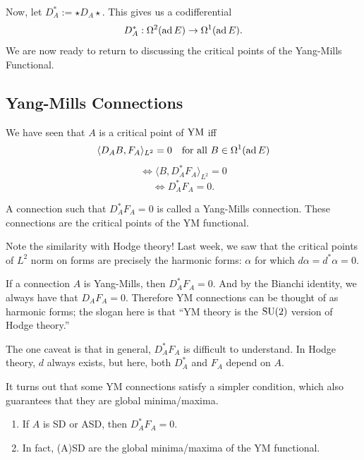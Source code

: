\documentclass[main]{subfiles}
\begin{document}
Now, let $D_A^\ast := \star D_A \star$. This gives us a codifferential
\[
D_A^\ast : \Omega^2(\operatorname{ad} E) \to \Omega^1(\operatorname{ad} E).
\]
We are now ready to return to discussing the critical points of the Yang-Mills Functional.

\subsection*{Yang-Mills Connections}

We have seen that $A$ is a critical point of $\operatorname{YM}$ iff
\[
\langle D_AB, F_A\rangle_{L^2} = 0 \quad \text{for all } B\in\Omega^1(\operatorname{ad} E)
\]
\[
\Leftrightarrow \langle B, D_A^\ast F_A\rangle_{L^2} = 0
\]
\[
\Leftrightarrow D_A^\ast F_A = 0.
\]

\begin{definition}
A connection such that $D_A^\ast F_A = 0$ is called a Yang-Mills connection. These connections are the critical points of the YM functional.
\end{definition}

Note the similarity with Hodge theory! Last week, we saw that the critical points of $L^2$ norm on forms are precisely the harmonic forms: $\alpha$ for which $d\alpha = d^\ast\alpha = 0$.

If a connection $A$ is Yang-Mills, then $D_A^\ast F_A = 0$. And by the Bianchi identity, we always have that $D_AF_A=0$. Therefore YM connections can be thought of as harmonic forms; the slogan here is that ``YM theory is the $\operatorname{SU}(2)$ version of Hodge theory.''

The one caveat is that in general, $D_A^\ast F_A$ is difficult to understand. In Hodge theory, $d$ always exists, but here, both $D_A^\ast$ and $F_A$ depend on $A$.

It turns out that some YM connections satisfy a simpler condition, which also guarantees that they are global minima/maxima.

\begin{lemma}
\begin{enumerate}
	\item If $A$ is SD or ASD, then $D_A^\ast F_A = 0$.
	\item In fact, (A)SD are the global minima/maxima of the YM functional.
\end{enumerate}
\end{lemma}
\end{document}
